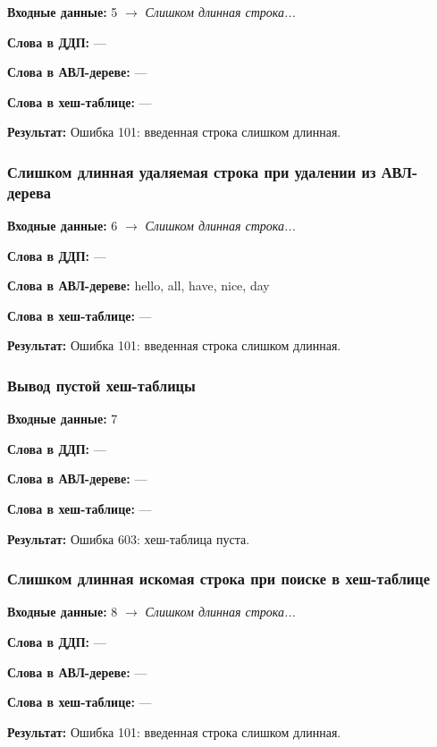 \documentclass[a4paper,12pt]{extarticle}
\begin{document}
\textbf{Входные данные: }
5 $\rightarrow$ \textit{Слишком длинная строка...}

\textbf{Слова в ДДП: }
---

\textbf{Слова в АВЛ-дереве: }
---

\textbf{Слова в хеш-таблице: }
---

\textbf{Результат: }
Ошибка 101: введенная строка слишком длинная.


\subsubsection{Слишком длинная удаляемая строка при удалении из АВЛ-дерева}

\textbf{Входные данные: }
6 $\rightarrow$ \textit{Слишком длинная строка...}

\textbf{Слова в ДДП: }
---

\textbf{Слова в АВЛ-дереве: }
hello, all, have, nice, day

\textbf{Слова в хеш-таблице: }
---

\textbf{Результат: }
Ошибка 101: введенная строка слишком длинная.



\subsubsection{Вывод пустой хеш-таблицы}

\textbf{Входные данные: }
7

\textbf{Слова в ДДП: }
---

\textbf{Слова в АВЛ-дереве: }
---

\textbf{Слова в хеш-таблице: }
---

\textbf{Результат: }
Ошибка 603: хеш-таблица пуста.


\subsubsection{Слишком длинная искомая строка при поиске в хеш-таблице}

\textbf{Входные данные: }
8 $\rightarrow$ \textit{Слишком длинная строка...}

\textbf{Слова в ДДП: }
---

\textbf{Слова в АВЛ-дереве: }
---

\textbf{Слова в хеш-таблице: }
---

\textbf{Результат: }
Ошибка 101: введенная строка слишком длинная.
\end{document}
